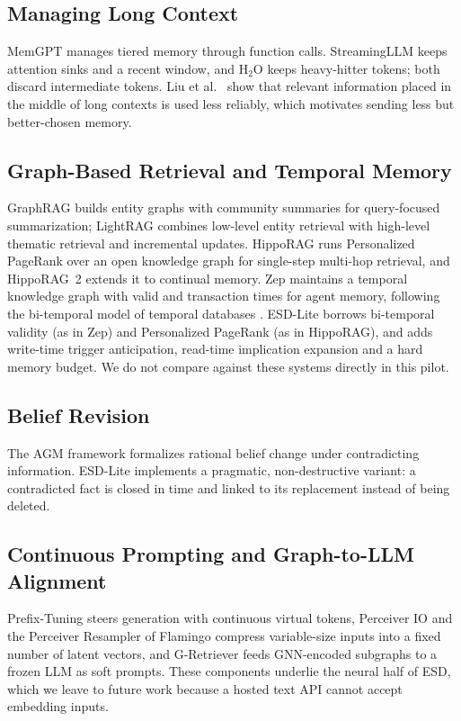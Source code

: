 \documentclass[conference]{IEEEtran}
\begin{document}
\subsection{Managing Long Context}
MemGPT \cite{b_memgpt} manages tiered memory through function calls. StreamingLLM \cite{b_streaming} keeps attention sinks and a recent window, and H$_2$O \cite{b_h2o} keeps heavy-hitter tokens; both discard intermediate tokens. Liu et al.\ \cite{b_lostmiddle} show that relevant information placed in the middle of long contexts is used less reliably, which motivates sending less but better-chosen memory.

\subsection{Graph-Based Retrieval and Temporal Memory}
GraphRAG \cite{b_graphrag} builds entity graphs with community summaries for query-focused summarization; LightRAG \cite{b_lightrag} combines low-level entity retrieval with high-level thematic retrieval and incremental updates. HippoRAG \cite{b_hipporag} runs Personalized PageRank \cite{b_ppr} over an open knowledge graph for single-step multi-hop retrieval, and HippoRAG~2 \cite{b_hipporag2} extends it to continual memory. Zep \cite{b_zep} maintains a temporal knowledge graph with valid and transaction times for agent memory, following the bi-temporal model of temporal databases \cite{b_temporaldb}. ESD-Lite borrows bi-temporal validity (as in Zep) and Personalized PageRank (as in HippoRAG), and adds write-time trigger anticipation, read-time implication expansion and a hard memory budget. We do not compare against these systems directly in this pilot.

\subsection{Belief Revision}
The AGM framework \cite{b_agm} formalizes rational belief change under contradicting information. ESD-Lite implements a pragmatic, non-destructive variant: a contradicted fact is closed in time and linked to its replacement instead of being deleted.

\subsection{Continuous Prompting and Graph-to-LLM Alignment}
Prefix-Tuning \cite{b_prefix} steers generation with continuous virtual tokens, Perceiver IO \cite{b_perceiverio} and the Perceiver Resampler of Flamingo \cite{b_flamingo} compress variable-size inputs into a fixed number of latent vectors, and G-Retriever \cite{b_gretriever} feeds GNN-encoded subgraphs to a frozen LLM as soft prompts. These components underlie the neural half of ESD, which we leave to future work because a hosted text API cannot accept embedding inputs.
\end{document}
